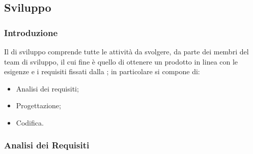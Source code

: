 \subsection{Sviluppo}

\subsubsection{Introduzione}
Il  di sviluppo comprende tutte le attività da svolgere, da parte dei membri del team di sviluppo, il cui fine è quello di ottenere un prodotto in linea con le esigenze e i requisiti fissati dalla ; in particolare si compone di:
\begin{itemize}
    \item Analisi dei requisiti;
    \item Progettazione;
    \item Codifica.
\end{itemize} 
\subsubsection{Analisi dei Requisiti} \label{sec:analisi-rischi}

